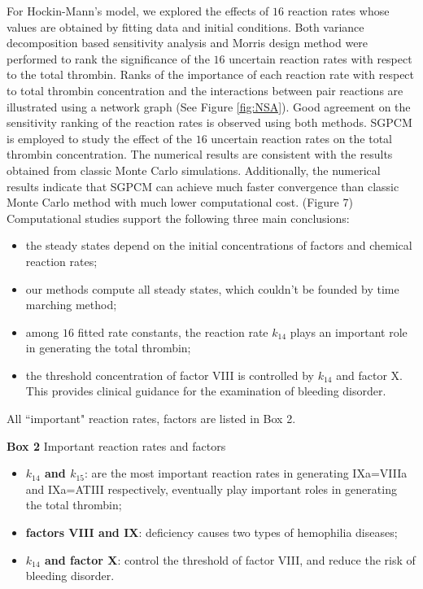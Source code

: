 For Hockin-Mann's model,   we explored the
effects of $16$ reaction rates whose values are obtained by fitting
data and initial conditions. Both variance decomposition based
sensitivity analysis and Morris design method were performed to rank
the significance of the $16$ uncertain reaction rates with respect
to the total thrombin. Ranks of the importance of each reaction rate
with respect to total thrombin concentration and the interactions
between pair reactions are illustrated using a network graph (See
Figure \ref{fig:NSA}). Good agreement on the sensitivity ranking of
the reaction rates is observed using both methods. SGPCM is employed
to study the effect of the $16$ uncertain reaction rates on the
total thrombin concentration. The numerical results are consistent
with the results obtained from classic Monte Carlo simulations.
Additionally, the numerical results indicate that SGPCM can achieve
much faster convergence than classic Monte Carlo method with much
lower computational cost. (Figure 7)
\\
Computational studies support the following three main conclusions:
\begin{itemize}
\item  the steady states depend on the initial concentrations of
factors and chemical reaction rates;
\item  our methods compute all steady states, which couldn't be founded by time marching method;
\item  among $16$ fitted rate constants, the reaction rate $k_{14}$ plays an important role in generating the total
thrombin;
\item  the threshold concentration of factor VIII is controlled by
$k_{14}$ and factor X. This provides clinical guidance for the
examination of bleeding disorder.
\end{itemize}

All ``important" reaction rates, factors are listed in Box 2.

\begin{algorithm}[H]
\SetAlgoLined
{\bf Box 2} Important reaction rates and factors
\begin{itemize}
\item {\bf $k_{14}$ and $k_{15}$}: are the most important reaction rates in
generating IXa=VIIIa and IXa=ATIII respectively, eventually play
important roles in generating the total thrombin;
\item {\bf factors VIII and IX}: deficiency causes two types of hemophilia
diseases;
\item {\bf $k_{14}$ and factor X}: control the threshold of factor
VIII, and reduce the risk of bleeding disorder.
\end{itemize}
\end{algorithm}


